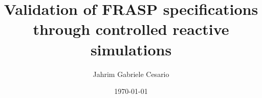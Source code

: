 
\school{\unibo}
\title{Validation of FRASP specifications through controlled reactive simulations}
\author{Jahrim Gabriele Cesario}
\date{\today}
\subject{Pervasive Computing}
